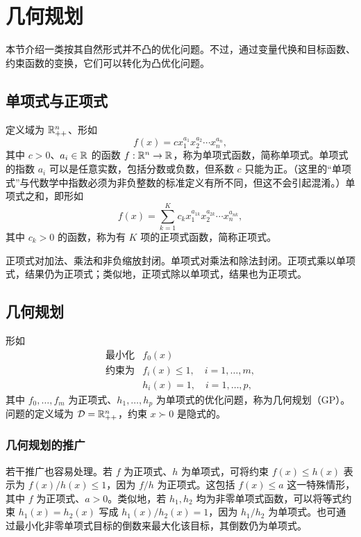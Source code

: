 \section{几何规划}
本节介绍一类按其自然形式并不凸的优化问题。不过，通过变量代换和目标函数、约束函数的变换，它们可以转化为凸优化问题。

\subsection{单项式与正项式}
定义域为 $\mathbb R_{++}^n$、形如
\begin{equation}
f(x)=cx_1^{a_1}x_2^{a_2}\cdots x_n^{a_n},\tag{4.41}
\end{equation}
其中 $c>0$、$a_i\in\mathbb R$ 的函数 $f:\mathbb R^n\to\mathbb R$，称为单项式函数，简称单项式。单项式的指数 $a_i$ 可以是任意实数，包括分数或负数，但系数 $c$ 只能为正。（这里的“单项式”与代数学中指数必须为非负整数的标准定义有所不同，但这不会引起混淆。）单项式之和，即形如
\begin{equation}
f(x)=\sum_{k=1}^K c_kx_1^{a_{1k}}x_2^{a_{2k}}\cdots x_n^{a_{nk}},\tag{4.42}
\end{equation}
其中 $c_k>0$ 的函数，称为有 $K$ 项的正项式函数，简称正项式。

正项式对加法、乘法和非负缩放封闭。单项式对乘法和除法封闭。正项式乘以单项式，结果仍为正项式；类似地，正项式除以单项式，结果也为正项式。

\subsection{几何规划}
形如
\begin{equation}
\begin{array}{ll}\text{最小化}&f_0(x)\\\text{约束为}&f_i(x)\le1,\quad i=1,\ldots,m,\\&h_i(x)=1,\quad i=1,\ldots,p,\end{array}\tag{4.43}
\end{equation}
其中 $f_0,\ldots,f_m$ 为正项式、$h_1,\ldots,h_p$ 为单项式的优化问题，称为几何规划（GP）。问题的定义域为 $\mathcal D=\mathbb R_{++}^n$，约束 $x\succ0$ 是隐式的。

\subsubsection*{几何规划的推广}
若干推广也容易处理。若 $f$ 为正项式、$h$ 为单项式，可将约束 $f(x)\le h(x)$ 表示为 $f(x)/h(x)\le1$，因为 $f/h$ 为正项式。这包括 $f(x)\le a$ 这一特殊情形，其中 $f$ 为正项式、$a>0$。类似地，若 $h_1,h_2$ 均为非零单项式函数，可以将等式约束 $h_1(x)=h_2(x)$ 写成 $h_1(x)/h_2(x)=1$，因为 $h_1/h_2$ 为单项式。也可通过最小化非零单项式目标的倒数来最大化该目标，其倒数仍为单项式。


